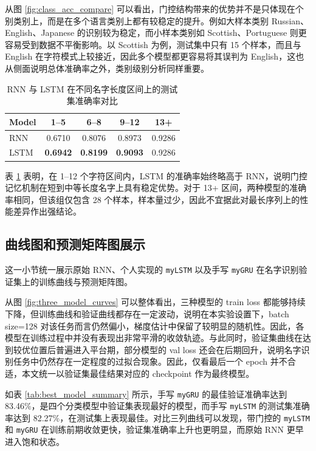 \documentclass[a4paper]{article}
\begin{document}
从图 \ref{fig:class_acc_compare} 可以看出，门控结构带来的优势并不是只体现在个别类别上，而是在多个语言类别上都有较稳定的提升。例如大样本类别 Russian、English、Japanese 的识别较为稳定，而小样本类别如 Scottish、Portuguese 则更容易受到数据不平衡影响。以 Scottish 为例，测试集中只有 15 个样本，而且与 English 在字符模式上较接近，因此多个模型都更容易将其误判为 English，这也从侧面说明总体准确率之外，类别级别分析同样重要。

\begin{table}[H]
\centering
\caption{RNN 与 LSTM 在不同名字长度区间上的测试集准确率对比}
\begin{tabular}{lcccc}
\toprule
Model & 1--5 & 6--8 & 9--12 & 13+ \\
\midrule
RNN & 0.6710 & 0.8076 & 0.8973 & 0.9286 \\
LSTM & \textbf{0.6942} & \textbf{0.8199} & \textbf{0.9093} & 0.9286 \\
\bottomrule
\end{tabular}
\label{tab:length_group}
\end{table}

表 \ref{tab:length_group} 表明，在 1--12 个字符区间内，LSTM 的准确率始终略高于 RNN，说明门控记忆机制在短到中等长度名字上具有稳定优势。对于 13+ 区间，两种模型的准确率相同，但该组仅包含 28 个样本，样本量过少，因此不宜据此对最长序列上的性能差异作出强结论。

\subsection{曲线图和预测矩阵图展示}
这一小节统一展示原始 RNN、个人实现的 \texttt{myLSTM} 以及手写 \texttt{myGRU} 在名字识别验证集上的训练曲线与预测矩阵图。

从图 \ref{fig:three_model_curves} 可以整体看出，三种模型的 train loss 都能够持续下降，但训练曲线和验证曲线都存在一定波动，说明在本实验设置下，batch size=128 对该任务而言仍然偏小，梯度估计中保留了较明显的随机性。因此，各模型在训练过程中并没有表现出非常平滑的收敛轨迹。与此同时，验证集曲线在达到较优位置后普遍进入平台期，部分模型的 val loss 还会在后期回升，说明名字识别任务中仍然存在一定程度的过拟合现象。因此，仅看最后一个 epoch 并不合适，本文统一以验证集最佳结果对应的 checkpoint 作为最终模型。

如表 \ref{tab:best_model_summary} 所示，手写 \texttt{myGRU} 的最佳验证准确率达到 83.46\%，是四个分类模型中验证集表现最好的模型，而手写 \texttt{myLSTM} 的测试集准确率达到 82.27\%，在测试集上表现最佳。对比三列曲线可以发现，带门控的 \texttt{myLSTM} 和 \texttt{myGRU} 在训练前期收敛更快，验证集准确率上升也更明显，而原始 RNN 更早进入饱和状态。
\end{document}
